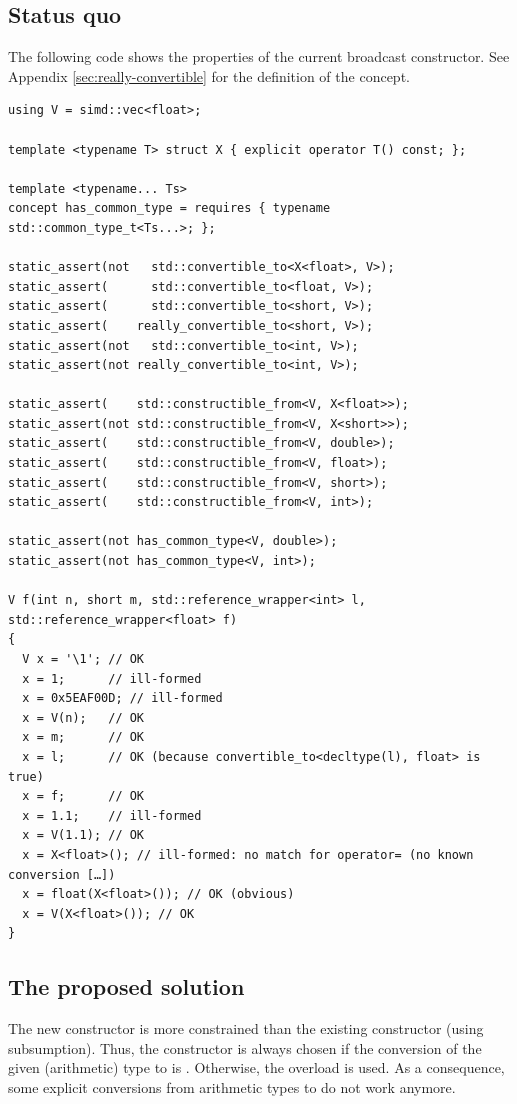 \subsection{Status quo}
The following code shows the properties of the current broadcast constructor.
See Appendix \ref{sec:really-convertible} for the definition of the 
concept.

\bigskip
\begin{lstlisting}[style=Vc]
using V = simd::vec<float>;

template <typename T> struct X { explicit operator T() const; };

template <typename... Ts>
concept has_common_type = requires { typename std::common_type_t<Ts...>; };

static_assert(not   std::convertible_to<X<float>, V>);
static_assert(      std::convertible_to<float, V>);
static_assert(      std::convertible_to<short, V>);
static_assert(    really_convertible_to<short, V>);
static_assert(not   std::convertible_to<int, V>);
static_assert(not really_convertible_to<int, V>);

static_assert(    std::constructible_from<V, X<float>>);
static_assert(not std::constructible_from<V, X<short>>);
static_assert(    std::constructible_from<V, double>);
static_assert(    std::constructible_from<V, float>);
static_assert(    std::constructible_from<V, short>);
static_assert(    std::constructible_from<V, int>);

static_assert(not has_common_type<V, double>);
static_assert(not has_common_type<V, int>);

V f(int n, short m, std::reference_wrapper<int> l, std::reference_wrapper<float> f)
{
  V x = '\1'; // OK
  x = 1;      // ill-formed
  x = 0x5EAF00D; // ill-formed
  x = V(n);   // OK
  x = m;      // OK
  x = l;      // OK (because convertible_to<decltype(l), float> is true)
  x = f;      // OK
  x = 1.1;    // ill-formed
  x = V(1.1); // OK
  x = X<float>(); // ill-formed: no match for operator= (no known conversion […])
  x = float(X<float>()); // OK (obvious)
  x = V(X<float>()); // OK
}
\end{lstlisting}

\subsection{The proposed solution}\label{sec:consteval}
The new  constructor is more constrained than the existing constructor (using
subsumption).
Thus, the  constructor is always chosen if the conversion of the given (arithmetic)
type to  is .
Otherwise, the  overload is used.
As a consequence, some explicit conversions from arithmetic types to  do not work
anymore.


